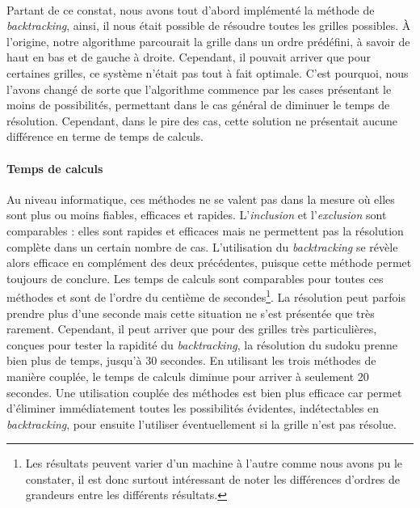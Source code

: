 \documentclass[12pt,a4paper]{report}
\begin{document}

\paragraph{} Partant de ce constat, nous avons tout d'abord implémenté la méthode de \emph{backtracking}, ainsi, il nous était possible de résoudre toutes les grilles possibles. \`{A} l'origine, notre algorithme parcourait la grille dans un ordre prédéfini, à savoir de haut en bas et de gauche à droite. Cependant, il pouvait arriver que pour certaines grilles, ce système n'était pas tout à fait optimale. C'est pourquoi, nous l'avons changé de sorte que l'algorithme commence par les cases présentant le moins de possibilités, permettant dans le cas général de diminuer le temps de résolution. Cependant, dans le pire des cas, cette solution ne présentait aucune différence en terme de temps de calculs. 

\paragraph{Temps de calculs} Au niveau informatique, ces méthodes ne se valent pas dans la mesure où elles sont plus ou moins fiables, efficaces et rapides. L'\emph{inclusion} et l'\emph{exclusion} sont comparables : elles sont rapides et efficaces mais ne permettent pas la résolution complète dans un certain nombre de cas. L'utilisation du \emph{backtracking} se révèle alors efficace en complément des deux précédentes, puisque cette méthode permet toujours de conclure. Les temps de calculs sont comparables pour toutes ces méthodes et sont de l'ordre du centième de secondes\footnote{Les résultats peuvent varier d'un machine à l'autre comme nous avons pu le constater, il est donc surtout intéressant de noter les différences d'ordres de grandeurs entre les différents résultats.}. La résolution peut parfois prendre plus d'une seconde mais cette situation ne s'est présentée que très rarement. Cependant, il peut arriver que pour des grilles très particulières, conçues pour tester la rapidité du \emph{backtracking}, la résolution du sudoku prenne bien plus de temps, jusqu'à 30 secondes. En utilisant les trois méthodes de manière couplée, le temps de calculs diminue pour arriver à seulement 20 secondes. Une utilisation couplée des méthodes est bien plus efficace car permet d'éliminer immédiatement toutes les possibilités évidentes, indétectables en \emph{backtracking}, pour ensuite l'utiliser éventuellement si la grille n'est pas résolue.
\end{document}
